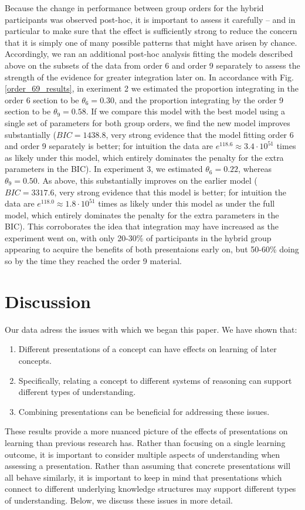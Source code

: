 \documentclass[man,10pt]{apa6}
\begin{document}
Because the change in performance between group orders for the hybrid participants was observed post-hoc, it is important to assess it carefully -- and in particular to make sure that the effect is sufficiently strong to reduce the concern that it is simply one of many possible patterns that might have arisen by chance. Accordingly, we ran an additional post-hoc analysis fitting the models described above on the subsets of the data from order 6 and order 9 separately to assess the strength of the evidence for greater integration later on. In accordance with Fig. \ref{order_69_results}, in exeriment 2 we estimated the proportion integrating in the order 6 section to be $\theta_6 = 0.30$, and the proportion integrating by the order 9 section to be $\theta_9 = 0.58$. If we compare this model with the best model using a single set of parameters for both group orders, we find the new model improves substantially ($BIC = 1438.8$, very strong evidence that the model fitting order 6 and order 9 separately is better; for intuition the data are $e^{118.6} \approx 3.4 \cdot 10^{51}$ times as likely under this model, which entirely dominates the penalty for the extra parameters in the BIC). In experiment 3, we estimated $\theta_6 = 0.22$, whereas $\theta_9 = 0.50$. As above, this substantially improves on the earlier model ($BIC=3317.6$, very strong evidence that this model is better; for intuition the data are $e^{118.0} \approx 1.8 \cdot 10^{51}$ times as likely under this model as under the full model, which entirely dominates the penalty for the extra parameters in the BIC). This corroborates the idea that integration may have increased as the experiment went on, with only 20-30\% of participants in the hybrid group appearing to acquire the benefits of both presentaions early on, but 50-60\% doing so by the time they reached the order 9 material.
\section{Discussion}
Our data adress the issues with which we began this paper. We have shown that:
\begin{enumerate}
\item Different presentations of a concept can have effects on learning of later concepts.
\item Specifically, relating a concept to different systems of reasoning can support different types of understanding.
\item Combining presentations can be beneficial for addressing these issues. 
\end{enumerate}
These results provide a more nuanced picture of the effects of presentations on learning than previous research has. Rather than focusing on a single learning outcome, it is important to consider multiple aspects of understanding when assessing a presentation. Rather than assuming that concrete presentations will all behave similarly, it is important to keep in mind that presentations which connect to different underlying knowledge structures may support different types of understanding. Below, we discuss these issues in more detail.\par
\end{document}
